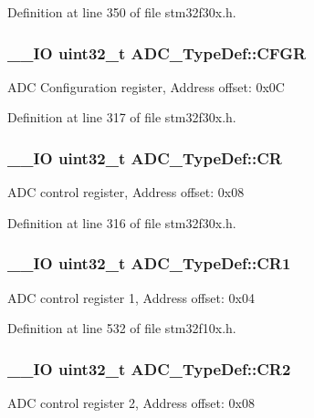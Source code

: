 Definition at line 350 of file stm32f30x.\-h.

\hypertarget{struct_a_d_c___type_def_a40a83116e2176d7197fc4b7d0eb08609}{
\subsubsection[{C\-F\-G\-R}]{\setlength{\rightskip}{0pt plus 5cm}\-\_\-\-\_\-\-I\-O {\bf uint32\-\_\-t} A\-D\-C\-\_\-\-Type\-Def\-::\-C\-F\-G\-R}}\label{struct_a_d_c___type_def_a40a83116e2176d7197fc4b7d0eb08609}
A\-D\-C Configuration register, Address offset\-: 0x0\-C 

Definition at line 317 of file stm32f30x.\-h.

\hypertarget{struct_a_d_c___type_def_a6126350919b341bfb13c0b24b30dc22a}{
\subsubsection[{C\-R}]{\setlength{\rightskip}{0pt plus 5cm}\-\_\-\-\_\-\-I\-O {\bf uint32\-\_\-t} A\-D\-C\-\_\-\-Type\-Def\-::\-C\-R}}\label{struct_a_d_c___type_def_a6126350919b341bfb13c0b24b30dc22a}
A\-D\-C control register, Address offset\-: 0x08 

Definition at line 316 of file stm32f30x.\-h.

\hypertarget{struct_a_d_c___type_def_a89b1ff4376683dd2896ea8b32ded05b2}{
\subsubsection[{C\-R1}]{\setlength{\rightskip}{0pt plus 5cm}\-\_\-\-\_\-\-I\-O {\bf uint32\-\_\-t} A\-D\-C\-\_\-\-Type\-Def\-::\-C\-R1}}\label{struct_a_d_c___type_def_a89b1ff4376683dd2896ea8b32ded05b2}
A\-D\-C control register 1, Address offset\-: 0x04 

Definition at line 532 of file stm32f10x.\-h.

\hypertarget{struct_a_d_c___type_def_a1053a65a21af0d27afe1bf9cf7b7aca7}{
\subsubsection[{C\-R2}]{\setlength{\rightskip}{0pt plus 5cm}\-\_\-\-\_\-\-I\-O {\bf uint32\-\_\-t} A\-D\-C\-\_\-\-Type\-Def\-::\-C\-R2}}\label{struct_a_d_c___type_def_a1053a65a21af0d27afe1bf9cf7b7aca7}
A\-D\-C control register 2, Address offset\-: 0x08 


